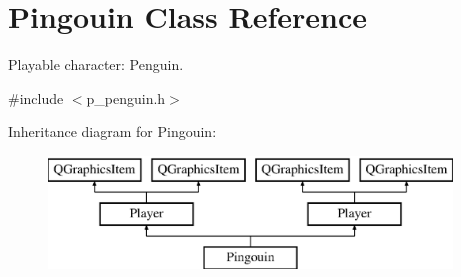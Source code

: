 \hypertarget{class_pingouin}{}\section{Pingouin Class Reference}
\label{class_pingouin}


Playable character\+: Penguin.  




{\ttfamily \#include $<$p\+\_\+penguin.\+h$>$}

Inheritance diagram for Pingouin\+:\begin{figure}[H]
\begin{center}
\leavevmode
\includegraphics[height=3.000000cm]{class_pingouin}
\end{center}
\end{figure}
